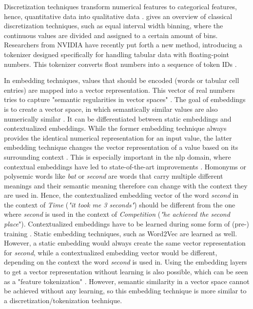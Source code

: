 Discretization techniques transform numerical features to categorical features, hence, quantitative data into qualitative data \cite{garcia2016BigDataPreprocessing}. 
\textcite{dougherty1995SupervisedUnsupervisedDiscretization} gives an overview of classical discretization techniques, such as equal interval width binning, where the continuous values are divided and assigned to a certain amount of bins.
Researchers from NVIDIA \cite{dong2022GeneratingSyntheticData} have recently put forth a new method, introducing a tokenizer designed specifically for handling tabular data with floating-point numbers.
This tokenizer converts float numbers into a sequence of token IDs \cite{dong2022GeneratingSyntheticData}.

In embedding techniques, values that should be encoded (\eg words or tabular cell entries) are mapped into a vector representation. 
This vector of real numbers tries to capture "semantic regularities in vector spaces" \cite[p. 2]{pilaluisa2022ContextualWordEmbeddings}.
The goal of embeddings is to create a vector space, in which semantically similar values are also numerically similar \cite{pilaluisa2022ContextualWordEmbeddings}.
It can be differentiated between static embeddings and contextualized embeddings. 
While the former embedding technique always provides the identical numerical representation for an input value, the latter embedding technique changes the vector representation of a value based on its surrounding context \cite{pilaluisa2022ContextualWordEmbeddings}.
This is especially important in the \gls{nlp} domain, where contextual embeddings have led to state-of-the-art improvements \cite{pilaluisa2022ContextualWordEmbeddings}.
Homonyms or polysemic words like \textit{bat} or \textit{second} are words that carry multiple different meanings and their semantic meaning therefore can change with the context they are used in.
Hence, the contextualized embedding vector of the word \textit{second} in the context of \textit{Time} (\eg \textit{"it took me 3 seconds"}) should be different from the one where \textit{second} is used in the context of \textit{Competition} (\eg \textit{"he achieved the second place}").
Contextualized embeddings have to be learned during some form of (pre-) training \cite{devlin2019BERTPretrainingDeep, iida2021TABBIEPretrainedRepresentations, deng2021TURLTableUnderstanding}. 
Static embedding techniques, such as Word2Vec \cite{mikolov2013DistributedRepresentationsWords} are learned as well.
However, a static embedding would always create the same vector representation for \textit{second}, while a contextualized embedding vector would be different, depending on the context the word \textit{second} is used in.
Using the embedding layers to get a vector representation without learning is also possible, which can be seen as a "feature tokenization" \cite{zheng2022DiffusionModelsMissing, gorishniy2021RevisitingDeepLearning}.
However, semantic similarity in a vector space cannot be achieved without any learning, so this embedding technique is more similar to a discretization/tokenization technique.


